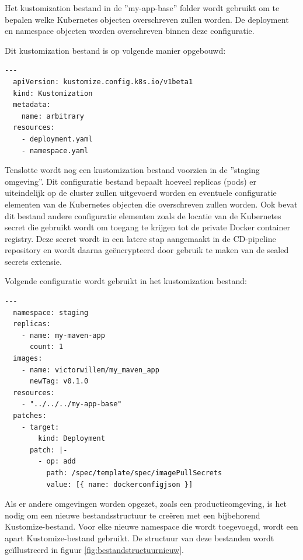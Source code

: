 \vspace{0.5cm}
Het kustomization bestand in de ''my-app-base'' folder wordt gebruikt om te bepalen welke Kubernetes objecten overschreven zullen worden. De deployment en namespace objecten worden overschreven binnen deze configuratie. 
\newline

Dit kustomization bestand is op volgende manier opgebouwd:
\newline 

\begin{lstlisting}[style=Kubernetesyaml,language=Kubernetesyaml]
  ---
  apiVersion: kustomize.config.k8s.io/v1beta1
  kind: Kustomization
  metadata:
    name: arbitrary
  resources:
    - deployment.yaml
    - namespace.yaml 
\end{lstlisting}
\clearpage

Tenslotte wordt nog een kustomization bestand voorzien in de ''staging omgeving''. Dit configuratie bestand bepaalt hoeveel replicas (pods) er uiteindelijk op de cluster zullen uitgevoerd worden en eventuele configuratie elementen van de Kubernetes objecten die overschreven zullen worden. Ook bevat dit bestand andere configuratie elementen zoals de locatie van de Kubernetes secret die gebruikt wordt om toegang te krijgen tot de private Docker container registry. Deze secret wordt in een latere stap aangemaakt in de CD-pipeline repository en wordt daarna geëncrypteerd door gebruik te maken van de sealed secrets extensie.
\newline

Volgende configuratie wordt gebruikt in het kustomization bestand:
\newline

\begin{lstlisting}[style=Kubernetesyaml,language=Kubernetesyaml]
  ---
  namespace: staging
  replicas:
    - name: my-maven-app
      count: 1
  images:
    - name: victorwillem/my_maven_app
      newTag: v0.1.0
  resources:
    - "../../../my-app-base"
  patches:
    - target:
        kind: Deployment
      patch: |-
        - op: add
          path: /spec/template/spec/imagePullSecrets
          value: [{ name: dockerconfigjson }]
\end{lstlisting}

\vspace{0.5cm}
Als er andere omgevingen worden opgezet, zoals een productieomgeving, is het nodig om een nieuwe bestandsstructuur te creëren met een bijbehorend Kustomize-bestand. Voor elke nieuwe namespace die wordt toegevoegd, wordt een apart Kustomize-bestand gebruikt. De structuur van deze bestanden wordt geïllustreerd in figuur \ref{fig:bestandstructuurnieuw}.

